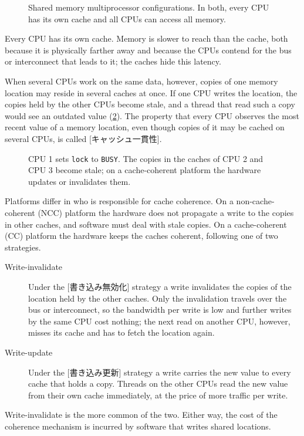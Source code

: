 \documentclass[../main.tex]{subfiles}
\begin{document}
\begin{figure}[htbp]
  \centering
  
  \caption{Shared memory multiprocessor configurations.  In both, every CPU
    has its own cache and all CPUs can access all memory.}
  \label{fig:l10-smp}
\end{figure}

Every CPU has its own cache.  Memory is slower to reach than the cache,
both because it is physically farther away and because the CPUs contend
for the bus or interconnect that leads to it; the caches hide this
latency.

When several CPUs work on the same data, however, copies of one memory
location may reside in several caches at once.  If one CPU writes the
location, the copies held by the other CPUs become stale, and a thread that
read such a copy would see an outdated value (\cref{fig:l10-coherence}).
The property that every CPU observes the most recent value of a memory
location, even though copies of it may be cached on several CPUs, is called
[キャッシュ一貫性].

\begin{figure}[htbp]
  \centering
  
  \caption{CPU 1 sets \texttt{lock} to \texttt{BUSY}.  The copies in the
    caches of CPU 2 and CPU 3 become stale; on a cache-coherent platform
    the hardware updates or invalidates them.}
  \label{fig:l10-coherence}
\end{figure}

Platforms differ in who is responsible for cache coherence.  On a
non-cache-coherent (NCC) platform the hardware does not propagate a write
to the copies in other caches, and software must deal with stale copies.
On a cache-coherent (CC) platform the hardware keeps the caches coherent,
following one of two strategies.
\begin{description}
  \item[Write-invalidate] Under the
    [書き込み無効化] strategy a write invalidates the
    copies of the location held by the other caches.  Only the
    invalidation travels over the bus or interconnect, so the bandwidth per
    write is low and further writes by the same CPU cost nothing; the next
    read on another CPU, however, misses its cache and has to fetch the
    location again.
  \item[Write-update] Under the [書き込み更新] strategy
    a write carries the new value to every cache that holds a copy.
    Threads on the other CPUs read the new value from their own cache
    immediately, at the price of more traffic per write.
\end{description}
Write-invalidate is the more common of the two.  Either way, the cost of
the coherence mechanism is incurred by software that writes shared
locations.
\end{document}
